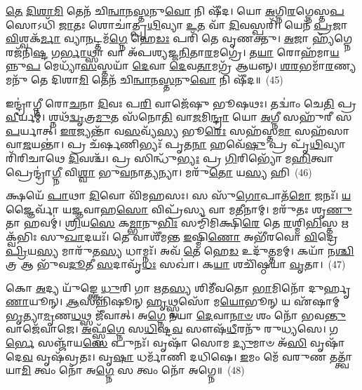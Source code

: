 \-\ul{𑌤𑍇} \ul{𑌦𑌿}\-\-\ul{𑌶𑌾}\-\-\ul{𑌮𑌿} 𑌤𑍇𑌨᳴ 𑌚𑌿\-\ul{𑌨𑍍𑌵𑌾}\-𑌨\-\ul{𑌸𑍍𑌤}\-𑌨𑍁\-\ul{𑌵𑍋} 𑌨𑌿 𑌷𑍀᳴𑌦। 𑌯𑍋 \ul{𑌅}\-𑌗𑍍𑌨𑌿\-\ul{𑌰}\-𑌗𑍍𑌨𑍇𑌸𑍍𑌤\-\ul{𑌪}\-𑌸𑍋\-𑌽𑌧𑌿᳴ \ul{𑌜𑌾}\-𑌤𑌃 𑌶𑍋𑌚𑌾॑𑌤𑍍𑌪𑍃\-\ul{𑌥𑌿}\-𑌵𑍍𑌯𑌾 \ul{𑌉}\-𑌤 𑌵𑌾᳴ \ul{𑌦𑌿}\-𑌵𑌸𑍍𑌪𑌰𑌿᳴। 𑌯𑍇𑌨᳴ \ul{𑌪𑍍𑌰}\-𑌜𑌾 \ul{𑌵𑌿}\-𑌶𑍍𑌵𑌕᳴\-\ul{𑌰𑍍𑌮𑌾} 𑌵𑍍𑌯𑌾\-\ul{𑌨}\-𑌟𑍍𑌤𑌮᳴\-\ul{𑌗𑍍𑌨𑍇} 𑌹𑍇\-\ul{𑌡𑌃} 𑌪𑌰𑌿᳴ 𑌤𑍇 𑌵𑍃𑌣𑌕𑍍𑌤𑍁। \ul{𑌅}\-𑌜𑌾 𑌹𑍍𑌯᳴𑌗𑍍𑌨𑍇𑌰𑌜᳴𑌨𑌿\-\ul{𑌷𑍍𑌟} 𑌗\-\ul{𑌰𑍍𑌭𑌾}\-𑌥𑍍𑌸𑌾 𑌵𑌾 𑌅᳴𑌪𑌶𑍍𑌯𑌜𑍍𑌜\-\ul{𑌨𑌿}\-𑌤𑌾\-\ul{𑌰}\-𑌮𑌗𑍍𑌰𑍇॑। 𑌤\-\ul{𑌯𑌾} 𑌰𑍋𑌹᳴𑌮𑌾\-\ul{𑌯}\-𑌨𑍍𑌨𑍁\-\ul{𑌪} 𑌮𑍇𑌧𑍍𑌯𑌾᳴\-\ul{𑌸}\-𑌸𑍍𑌤𑌯𑌾᳴ \ul{𑌦𑍇}\-𑌵𑌾 \ul{𑌦𑍇}\-𑌵\-\ul{𑌤𑌾}\-𑌮𑌗𑍍𑌰᳴ 𑌆𑌯𑌨𑍍𑌨𑍍। \ul{𑌶}\-\-\ul{𑌰}\-𑌭𑌮𑌾᳴\-\ul{𑌰}\-𑌣𑍍𑌯𑌮𑌨𑍁᳴ 𑌤𑍇 𑌦𑌿𑌶𑌾\-\ul{𑌮𑌿} 𑌤𑍇𑌨᳴ 𑌚𑌿\-\ul{𑌨𑍍𑌵𑌾}\-𑌨\-\ul{𑌸𑍍𑌤}\-𑌨𑍁\-\ul{𑌵𑍋} 𑌨𑌿 𑌷𑍀᳴𑌦॥~(45)

{\anuvakamend[{𑌅\-\ul{𑌗𑍍𑌨𑍇} 𑌮𑌾 𑌹𑌿𑍞᳴\-\ul{𑌸𑍀}\-𑌰\-\ul{𑌗𑍍𑌨𑍇} 𑌮𑍋𑌷𑍍𑌟𑍍𑌰᳴𑌮𑌾\-\ul{𑌰}\-𑌣𑍍𑌯𑌮𑌨𑍁᳴ 𑌶\-\ul{𑌰}\-𑌭𑌂 𑌨𑌵᳴ 𑌚}]}%

𑌇𑌨𑍍𑌦𑍍𑌰𑌾॑𑌗𑍍𑌨𑍀 𑌰𑍋\-\ul{𑌚}\-𑌨𑌾 \ul{𑌦𑌿}\-𑌵𑌃 𑌪\-\ul{𑌰𑌿} 𑌵𑌾𑌜𑍇᳴𑌷𑍁 𑌭𑍂𑌷𑌥𑌃। 𑌤𑌦𑍍𑌵𑌾𑌂॑ 𑌚𑍇\-\ul{𑌤𑌿} 𑌪𑍍𑌰 \ul{𑌵𑍀}\-𑌰𑍍𑌯𑌮𑍍॑। 𑌶𑍍𑌨𑌥᳴\-\ul{𑌦𑍍𑌵𑍃}\-𑌤𑍍𑌰\-\ul{𑌮𑍁}\-𑌤 𑌸᳴𑌨𑍋\-\ul{𑌤𑌿} 𑌵𑌾\-\ul{𑌜}\-𑌮𑌿\-\ul{𑌨𑍍𑌦𑍍𑌰𑌾} 𑌯𑍋 \ul{𑌅}\-𑌗𑍍𑌨𑍀 𑌸𑌹𑍁᳴𑌰𑍀 𑌸\-\ul{𑌪}\-𑌰𑍍𑌯𑌾𑌤𑍍। \ul{𑌇}\-\-\ul{𑌰}\-𑌜𑍍𑌯𑌨𑍍𑌤𑌾᳴ 𑌵\-\ul{𑌸}\-𑌵𑍍𑌯᳴\-\ul{𑌸𑍍𑌯} 𑌭𑍂\-\ul{𑌰𑍇𑌃} 𑌸𑌹᳴𑌸𑍍𑌤\-\ul{𑌮𑌾} 𑌸𑌹᳴𑌸𑌾 𑌵𑌾\-\ul{𑌜}\-𑌯𑌨𑍍𑌤𑌾॑। 𑌪𑍍𑌰 𑌚᳴𑌰𑍍\mbox{}\-\ul{𑌷}\-𑌣𑌿𑌭𑍍𑌯𑌃᳴ 𑌪𑍃𑌤\-\ul{𑌨𑌾} 𑌹𑌵𑍇᳴\-\ul{𑌷𑍁} 𑌪𑍍𑌰 𑌪𑍃᳴\-\ul{𑌥𑌿}\-𑌵𑍍𑌯𑌾 𑌰𑌿᳴𑌰𑌿𑌚𑌾𑌥𑍇 \ul{𑌦𑌿}\-𑌵𑌶𑍍𑌚᳴। 𑌪𑍍𑌰 𑌸𑌿𑌨𑍍𑌧𑍁᳴\-\ul{𑌭𑍍𑌯𑌃} 𑌪𑍍𑌰 \ul{𑌗𑌿}\-𑌰𑌿𑌭𑍍𑌯𑍋᳴ 𑌮\-\ul{𑌹𑌿}\-𑌤𑍍𑌵𑌾 𑌪𑍍𑌰𑍇𑌨𑍍𑌦𑍍𑌰𑌾॑\-\ul{𑌗𑍍𑌨𑍀} 𑌵𑌿\-\ul{𑌶𑍍𑌵𑌾} 𑌭𑍁\-\ul{𑌵}\-𑌨𑌾\-\ul{𑌤𑍍𑌯}\-𑌨𑍍𑌯𑌾। 𑌮𑌰𑍁᳴\-\ul{𑌤𑍋} 𑌯\-\ul{𑌸𑍍𑌯} 𑌹𑌿~(46)

𑌕𑍍𑌷𑌯𑍇᳴ \ul{𑌪𑌾}\-𑌥𑌾 \ul{𑌦𑌿}\-𑌵𑍋 𑌵𑌿᳴𑌮𑌹𑌸𑌃। 𑌸 𑌸𑍁᳴\-\ul{𑌗𑍋}\-𑌪𑌾𑌤᳴\-\ul{𑌮𑍋} 𑌜𑌨𑌃᳴। \ul{𑌯}\-𑌜𑍍𑌞𑍈𑌰𑍍𑌵𑌾᳴ 𑌯𑌜𑍍𑌞𑌵𑌾𑌹\-\ul{𑌸𑍋} 𑌵𑌿𑌪𑍍𑌰᳴𑌸𑍍𑌯 𑌵𑌾 𑌮\-\ul{𑌤𑍀}\-𑌨𑌾𑌮𑍍। 𑌮𑌰𑍁᳴𑌤𑌃 𑌶𑍃\-\ul{𑌣𑍁}\-𑌤𑌾 𑌹𑌵𑌮𑍍॑। \ul{𑌶𑍍𑌰𑌿}\-𑌯\-\ul{𑌸𑍇} 𑌕\-\ul{𑌮𑍍𑌭𑌾}\-𑌨𑍁\-\ul{𑌭𑌿𑌃} 𑌸𑌮𑍍𑌮𑌿᳴𑌮𑌿𑌕𑍍𑌷𑌿\-\ul{𑌰𑍇} 𑌤𑍇 \ul{𑌰}\-𑌶𑍍𑌮𑌿\-\ul{𑌭𑌿}\-𑌸𑍍𑌤 𑌋𑌕𑍍𑌵᳴𑌭𑌿𑌃 𑌸𑍁\-\ul{𑌖𑌾}\-𑌦𑌯𑌃᳴। 𑌤𑍇 𑌵𑌾𑌶𑍀᳴𑌮𑌨𑍍𑌤 \ul{𑌇}\-𑌷𑍍𑌮𑌿\-\ul{𑌣𑍋} 𑌅𑌭𑍀᳴𑌰𑌵𑍋 \ul{𑌵𑌿}\-𑌦𑍍𑌰𑍇 \ul{𑌪𑍍𑌰𑌿}\-𑌯\-\ul{𑌸𑍍𑌯} 𑌮𑌾𑌰𑍁᳴𑌤\-\ul{𑌸𑍍𑌯} 𑌧𑌾𑌮𑍍𑌨𑌃᳴। 𑌅𑌵᳴ \ul{𑌤𑍇} 𑌹𑍇\-\ul{𑌡} 𑌉𑌦𑍁᳴\-\ul{𑌤𑍍𑌤}\-𑌮𑌮𑍍। 𑌕𑌯𑌾᳴ 𑌨\-\ul{𑌶𑍍𑌚𑌿}\-𑌤𑍍𑌰 𑌆 𑌭𑍁᳴𑌵\-\ul{𑌦𑍂}\-𑌤𑍀 \ul{𑌸}\-𑌦𑌾𑌵𑍃᳴\-\ul{𑌧𑌃} 𑌸𑌖𑌾॑। 𑌕\-\ul{𑌯𑌾} 𑌶𑌚𑌿᳴𑌷𑍍𑌠𑌯𑌾 \ul{𑌵𑍃}\-𑌤𑌾।~(47)

𑌕𑍋 \ul{𑌅}\-𑌦𑍍𑌯 𑌯𑍁᳴𑌙𑍍𑌕𑍍𑌤𑍇 \ul{𑌧𑍁}\-𑌰𑌿 𑌗𑌾 \ul{𑌋}\-𑌤\-\ul{𑌸𑍍𑌯} 𑌶𑌿𑌮𑍀᳴𑌵𑌤𑍋 \ul{𑌭𑌾}\-𑌮𑌿𑌨𑍋᳴ 𑌦𑍁𑌰𑍍\mbox{}𑌹𑍃\-\ul{𑌣𑌾}\-𑌯𑍂𑌨𑍍। \ul{𑌆}\-𑌸𑌨𑍍𑌨𑌿᳴𑌷𑍂𑌨𑍍 \ul{𑌹𑍃}\-𑌥𑍍𑌸𑍍𑌵𑌸𑍋᳴ 𑌮\-\ul{𑌯𑍋}\-𑌭𑍂𑌨𑍍 𑌯 𑌏᳴𑌷𑌾𑌮𑍍 \ul{𑌭𑍃}\-𑌤𑍍𑌯𑌾\-\ul{𑌮𑍃}\-𑌣\-\ul{𑌧}\-𑌥𑍍𑌸 𑌜𑍀᳴𑌵𑌾𑌤𑍍। 𑌅\-\ul{𑌗𑍍𑌨𑍇} 𑌨𑌯𑌾 \ul{𑌦𑍇}\-𑌵𑌾\-\ul{𑌨𑌾}\-\-\ul{𑍞} 𑌶𑌂 𑌨𑍋᳴ 𑌭𑌵\-\ul{𑌨𑍍𑌤𑍁} 𑌵𑌾𑌜𑍇᳴𑌵𑌾𑌜𑍇। \ul{𑌅}\-𑌫𑍍𑌸𑍍𑌵᳴\-\ul{𑌗𑍍𑌨𑍇} 𑌸\-\ul{𑌧𑌿}\-𑌷𑍍𑌟\-\ul{𑌵} 𑌸𑍗𑌷᳴\-\ul{𑌧𑍀}\-𑌰𑌨𑍁᳴ 𑌰𑍁𑌧𑍍𑌯𑌸𑍇। 𑌗\-\ul{𑌰𑍍𑌭𑍇} 𑌸𑌞𑍍𑌜𑌾᳴𑌯\-\ul{𑌸𑍇} 𑌪𑍁𑌨𑌃᳴। 𑌵𑍃𑌷𑌾᳴ 𑌸𑍋𑌮 \ul{𑌦𑍍𑌯𑍁}\-𑌮𑌾𑍞 𑌅᳴\-\ul{𑌸𑌿} 𑌵𑍃𑌷𑌾᳴ 𑌦𑍇\-\ul{𑌵} 𑌵𑍃𑌷᳴𑌵𑍍𑌰𑌤𑌃। 𑌵𑍃\-\ul{𑌷𑌾} 𑌧𑌰𑍍𑌮𑌾᳴𑌣𑌿 𑌦𑌧𑌿𑌷𑍇। \ul{𑌇}\-𑌮𑌂 𑌮𑍇᳴ 𑌵𑌰𑍁𑌣 𑌤𑌤𑍍𑌤𑍍𑌵𑌾᳴ 𑌯𑌾\-\ul{𑌮𑌿} 𑌤𑍍𑌵𑌂 𑌨𑍋᳴ 𑌅\-\ul{𑌗𑍍𑌨𑍇} 𑌸 𑌤𑍍𑌵𑌂 𑌨𑍋᳴ 𑌅𑌗𑍍𑌨𑍇॥~(48)

